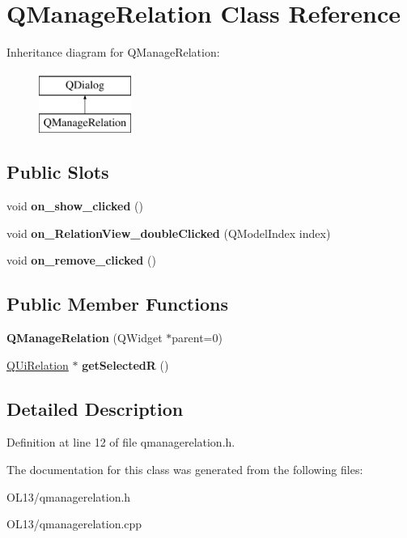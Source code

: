 \hypertarget{class_q_manage_relation}{}\section{Q\+Manage\+Relation Class Reference}
\label{class_q_manage_relation}
Inheritance diagram for Q\+Manage\+Relation\+:\begin{figure}[H]
\begin{center}
\leavevmode
\includegraphics[height=2.000000cm]{class_q_manage_relation}
\end{center}
\end{figure}
\subsection*{Public Slots}
\begin{DoxyCompactItemize}
\item 
\mbox{\label{class_q_manage_relation_aef7e40af43fa29fb5d8b325718897883}} 
void {\bfseries on\+\_\+show\+\_\+clicked} ()
\item 
\mbox{\label{class_q_manage_relation_a45a9416aa18e0d6729ef5d0f9c37e626}} 
void {\bfseries on\+\_\+\+Relation\+View\+\_\+double\+Clicked} (Q\+Model\+Index index)
\item 
\mbox{\label{class_q_manage_relation_a94a9a99974177cde7677f5c6ede78722}} 
void {\bfseries on\+\_\+remove\+\_\+clicked} ()
\end{DoxyCompactItemize}
\subsection*{Public Member Functions}
\begin{DoxyCompactItemize}
\item 
\mbox{\label{class_q_manage_relation_af470c7a01389927cd834432d4d37f5c9}} 
{\bfseries Q\+Manage\+Relation} (Q\+Widget $\ast$parent=0)
\item 
\mbox{\label{class_q_manage_relation_a28ec1f2567446d681dd20bfcf3c53a41}} 
\hyperlink{class_q_ui_relation}{Q\+Ui\+Relation} $\ast$ {\bfseries get\+SelectedR} ()
\end{DoxyCompactItemize}


\subsection{Detailed Description}


Definition at line 12 of file qmanagerelation.\+h.



The documentation for this class was generated from the following files\+:\begin{DoxyCompactItemize}
\item 
O\+L13/qmanagerelation.\+h\item 
O\+L13/qmanagerelation.\+cpp\end{DoxyCompactItemize}
